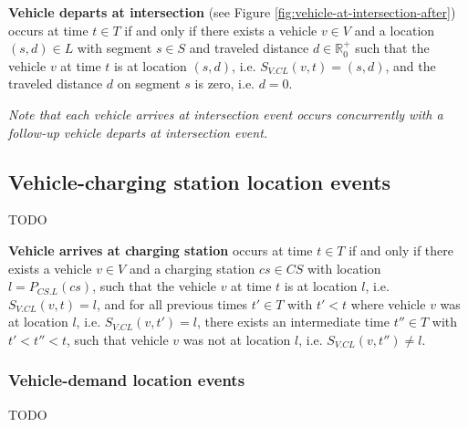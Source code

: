 \documentclass[graybox]{svmult}
\begin{document}
\vspace{2mm}
\noindent \textbf{Vehicle departs at intersection} (see Figure \ref{fig:vehicle-at-intersection-after}) occurs at time $t \in T$ if and only if there exists a vehicle $v \in V$ and a location $(s,d) \in L$ with segment $s \in S$ and traveled distance $d \in \mathbb{R}_0^+$ such that the vehicle $v$ at time $t$ is at location $(s,d)$, i.e. $S_{V.CL}(v,t) = (s,d)$, and the traveled distance $d$ on segment $s$ is zero, i.e. $d = 0$.

\vspace{2mm}
\noindent \textit{Note that each vehicle arrives at intersection event occurs concurrently with a follow-up vehicle departs at intersection event.}

\subsection{Vehicle-charging station location events}
\label{sec:charging-station-location-events}

TODO

\vspace{2mm}
\noindent \textbf{Vehicle arrives at charging station} occurs at time $t \in T$ if and only if there exists a vehicle $v \in V$ and a charging station $cs \in CS$ with location $l = P_{CS.L}(cs)$, such that the vehicle $v$ at time $t$ is at location $l$, i.e. $S_{V.CL}(v, t) = l$, and for all previous times $t' \in T$ with $t' < t$ where vehicle $v$ was at location $l$, i.e. $S_{V.CL}(v, t') = l$, there exists an intermediate time $t'' \in T$ with $t' < t'' < t$, such that vehicle $v$ was not at location $l$, i.e. $S_{V.CL}(v, t'') \neq l$.

\subsubsection{Vehicle-demand location events}
\label{sec:demand-location-events}

TODO
\end{document}
